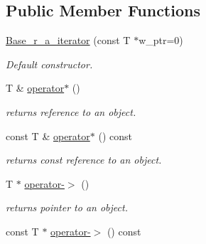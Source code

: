 \subsection*{Public Member Functions}
\begin{DoxyCompactItemize}
\item 
\hyperlink{classtasks_1_1Base__r__a__iterator_a9b642f7fa44c6d9d74ba8c43794db998}{Base\+\_\+r\+\_\+a\+\_\+iterator} (const T $\ast$w\+\_\+ptr=0)
\begin{DoxyCompactList}\small\item\em Default constructor. \end{DoxyCompactList}\item 
T \& \hyperlink{classtasks_1_1Base__r__a__iterator_a7166ade7d4d19a0cb68a4587ce0863b2}{operator$\ast$} ()\hypertarget{classtasks_1_1Base__r__a__iterator_a7166ade7d4d19a0cb68a4587ce0863b2}{}\label{classtasks_1_1Base__r__a__iterator_a7166ade7d4d19a0cb68a4587ce0863b2}

\begin{DoxyCompactList}\small\item\em returns reference to an object. \end{DoxyCompactList}\item 
const T \& \hyperlink{classtasks_1_1Base__r__a__iterator_a613ef9dbb121bb125922fea738c25b89}{operator$\ast$} () const \hypertarget{classtasks_1_1Base__r__a__iterator_a613ef9dbb121bb125922fea738c25b89}{}\label{classtasks_1_1Base__r__a__iterator_a613ef9dbb121bb125922fea738c25b89}

\begin{DoxyCompactList}\small\item\em returns const reference to an object. \end{DoxyCompactList}\item 
T $\ast$ \hyperlink{classtasks_1_1Base__r__a__iterator_aef4baa1783209bbeef9be780cf43394e}{operator-\/$>$} ()\hypertarget{classtasks_1_1Base__r__a__iterator_aef4baa1783209bbeef9be780cf43394e}{}\label{classtasks_1_1Base__r__a__iterator_aef4baa1783209bbeef9be780cf43394e}

\begin{DoxyCompactList}\small\item\em returns pointer to an object. \end{DoxyCompactList}\item 
const T $\ast$ \hyperlink{classtasks_1_1Base__r__a__iterator_ab07633059431202af6a457a07a940454}{operator-\/$>$} () const \hypertarget{classtasks_1_1Base__r__a__iterator_ab07633059431202af6a457a07a940454}{}\label{classtasks_1_1Base__r__a__iterator_ab07633059431202af6a457a07a940454}


\end{DoxyCompactItemize}

